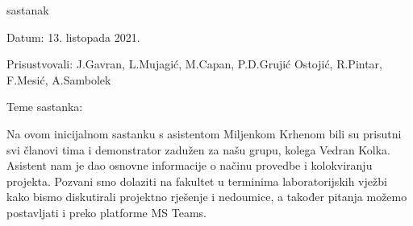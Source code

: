 \begin{packed_enum}
			\item  sastanak
			\item[] \begin{packed_item}
				\item Datum: 13. listopada 2021.
				\item Prisustvovali: J.Gavran, L.Mujagić, M.Capan, P.D.Grujić Ostojić, R.Pintar, F.Mesić, A.Sambolek
				\item Teme sastanka:
				\begin{packed_item}
					\item  Na ovom inicijalnom sastanku s asistentom Miljenkom Krhenom bili su prisutni svi članovi tima i demonstrator zadužen za našu grupu, kolega Vedran Kolka.
					Asistent nam je dao osnovne informacije o načinu provedbe i kolokviranju projekta. Pozvani smo dolaziti na fakultet u terminima laboratorijskih vježbi kako bismo
					diskutirali projektno rješenje i nedoumice, a također pitanja možemo postavljati i preko platforme MS Teams.
					

\end{packed_item}
\end{packed_item}
\end{packed_enum}
